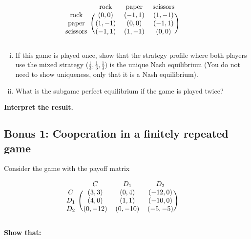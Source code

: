 \documentclass[10pt]{article}
\begin{document}
\begin{equation*}
    \begin{blockarray}{cccc}
        & \text{rock} & \text{paper} & \text{scissors} \\
        \begin{block}{c(ccc)}
            \text{rock}     & (0, 0)  & (-1, 1) & (1, -1) \\
            \text{paper}    & (1, -1) & (0, 0) & (-1, 1) \\
            \text{scissors} & (-1, 1) & (1, -1) & (0, 0) \\
        \end{block}
    \end{blockarray}\qquad
\end{equation*}

\begin{enumerate}[(i)]
    \item If this game is played once, show that the strategy profile where both
players use the mixed strategy (\(\frac{1}{3}, \frac{1}{3}, \frac{1}{3}\)) is
the unique Nash equilibrium (You do not need to show uniqueness, only that it is
a Nash equilibrium).
    \item What is the subgame perfect equilibrium if the game is played twice?
\end{enumerate}

\textbf{Interpret the result.}

\subsection*{Bonus 1: Cooperation in a finitely repeated game}

Consider the game with the payoff matrix

\begin{equation*}
    \begin{blockarray}{cccc}
        & C & D_1 & D_2 \\
        \begin{block}{c(ccc)}
            C   & (3, 3)   & (0, 4)   & (-12, 0) \\
            D_1 & (4, 0)   & (1, 1)   & (-10, 0) \\
            D_2 & (0, -12) & (0, -10) & (-5, -5) \\
        \end{block}
    \end{blockarray}\qquad
\end{equation*}

\textbf{Show that:}
\end{document}
